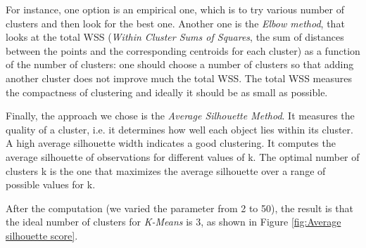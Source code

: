 \documentclass[a4paper,11pt,dvipsnames]{article}
\begin{document}
For instance, one option is an empirical one, which is to try various number of clusters and then look for the best one. Another one is the \textit{Elbow method}, that looks at the total WSS (\textit{Within Cluster Sums of Squares}, the sum of distances between the points and the corresponding centroids for each cluster) as a function of the number of clusters: one should choose a number of clusters so that adding another cluster does not improve much the total WSS. The total WSS measures the compactness of clustering and ideally it should be as small as possible. 

Finally, the approach we chose is the \textit{Average Silhouette Method}. It measures the quality of a cluster, i.e. it determines how well each object lies within its cluster. A high average silhouette width indicates a good clustering. It computes the average silhouette of observations for different values of k. The optimal number of clusters k is the one that maximizes the average silhouette over a range of possible values for k\cite{books/wi/KaufmanR90}.

After the computation (we varied the parameter from 2 to 50), the result is that the ideal number of clusters for \textit{K-Means} is 3, as shown in Figure \ref{fig:Average silhouette score}.
\end{document}
